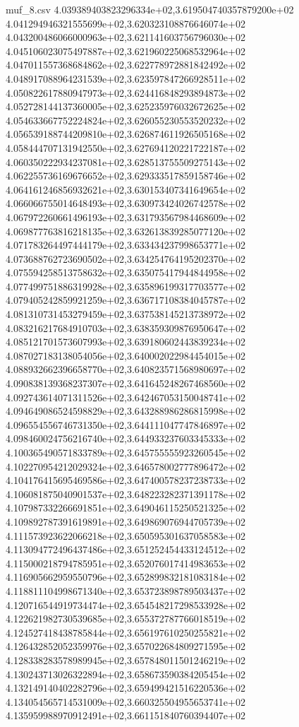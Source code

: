 \begin{filecontents*}{muf_8.csv}
4.039389403823296334e+02,3.619504740357879200e+02
4.041294946321555699e+02,3.620323108876646074e+02
4.043200486066000963e+02,3.621141603756796030e+02
4.045106023075497887e+02,3.621960225068532964e+02
4.047011557368684862e+02,3.622778972881842492e+02
4.048917088964231539e+02,3.623597847266928511e+02
4.050822617880947973e+02,3.624416848293894873e+02
4.052728144137360005e+02,3.625235976032672625e+02
4.054633667752224824e+02,3.626055230553520232e+02
4.056539188744209810e+02,3.626874611926505168e+02
4.058444707131942550e+02,3.627694120221722187e+02
4.060350222934237081e+02,3.628513755509275143e+02
4.062255736169676652e+02,3.629333517859158746e+02
4.064161246856932621e+02,3.630153407341649654e+02
4.066066755014648493e+02,3.630973424026742578e+02
4.067972260661496193e+02,3.631793567984468609e+02
4.069877763816218135e+02,3.632613839285077120e+02
4.071783264497444179e+02,3.633434237998653771e+02
4.073688762723690502e+02,3.634254764195202370e+02
4.075594258513758632e+02,3.635075417944844958e+02
4.077499751886319928e+02,3.635896199317703577e+02
4.079405242859921259e+02,3.636717108384045787e+02
4.081310731453279459e+02,3.637538145213738972e+02
4.083216217684910703e+02,3.638359309876950647e+02
4.085121701573607993e+02,3.639180602443839234e+02
4.087027183138054056e+02,3.640002022984454015e+02
4.088932662396658770e+02,3.640823571568980697e+02
4.090838139368237307e+02,3.641645248267468560e+02
4.092743614071311526e+02,3.642467053150048741e+02
4.094649086524598829e+02,3.643288986286815998e+02
4.096554556746731350e+02,3.644111047747846897e+02
4.098460024756216740e+02,3.644933237603345333e+02
4.100365490571833789e+02,3.645755555923260545e+02
4.102270954212029324e+02,3.646578002777896472e+02
4.104176415695469586e+02,3.647400578237238733e+02
4.106081875040901537e+02,3.648223282371391178e+02
4.107987332266691851e+02,3.649046115250521325e+02
4.109892787391619891e+02,3.649869076944705739e+02
4.111573923622066218e+02,3.650595301637058583e+02
4.113094772496437486e+02,3.651252454433124512e+02
4.115000218794785951e+02,3.652076017414983653e+02
4.116905662959550796e+02,3.652899832181083184e+02
4.118811104998671340e+02,3.653723898789503437e+02
4.120716544919734474e+02,3.654548217298533928e+02
4.122621982730539685e+02,3.655372787766018519e+02
4.124527418438785844e+02,3.656197610250255821e+02
4.126432852052359976e+02,3.657022684809271595e+02
4.128338283578989945e+02,3.657848011501246219e+02
4.130243713026322894e+02,3.658673590384205454e+02
4.132149140402282796e+02,3.659499421516220536e+02
4.134054565714531009e+02,3.660325504955653741e+02
4.135959988970912491e+02,3.661151840760394407e+02

\end{filecontents*}
